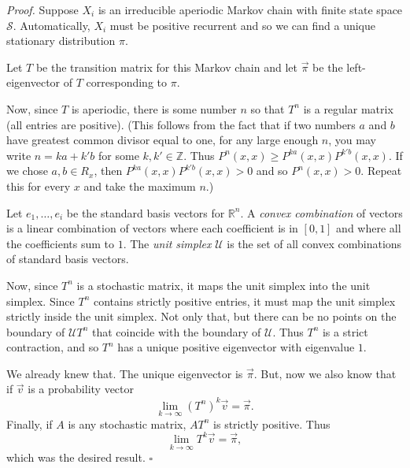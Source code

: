 \documentclass{problemset}
\newcommand{\R}{\mathbb{R}}
\newcommand{\Z}{\mathbb{Z}}
\newcommand{\1}{\mathbf{1}}
\newenvironment{proof}{\emph{Proof.}}{\hfill$\square$}
\begin{document}
	\begin{proof}
		Suppose $X_i$ is an irreducible aperiodic Markov chain with finite state space $\mathcal S$.  Automatically,
		$X_i$ must be positive recurrent and so we can find a unique stationary distribution $\pi$.
		
		Let $T$ be the transition matrix for this Markov chain and let $\vec \pi$ be the left-eigenvector
		of $T$ corresponding to $\pi$.

		Now, since $T$ is aperiodic, there is some number $n$ so that $T^n$ is a regular matrix (all
		entries are positive).  (This follows from the fact that if two numbers $a$ and $b$
		have greatest common divisor equal to one, for any large enough $n$, you may write $n=ka+k'b$
		for some $k,k'\in \Z$.  Thus $P^n(x,x)\geq P^{ka}(x,x)P^{k'b}(x,x)$.  If we chose $a,b\in R_x$,
		then $P^{ka}(x,x)P^{k'b}(x,x) >0$ and so $P^n(x,x)>0$.  Repeat this for every $x$ and take the
		maximum $n$.)

		Let $e_1,\ldots, e_i$ be the standard basis vectors for $\R^n$. A \emph{convex
		combination} of vectors is a linear combination of vectors where each coefficient is
		in $[0,1]$ and where all the coefficients sum to $1$.  The \emph{unit simplex} $\mathcal U$
		is the set of all convex combinations of standard basis vectors.

		Now, since $T^n$ is a stochastic matrix, it maps the unit simplex into the unit simplex.  Since
		$T^n$ contains strictly positive entries, it must map the unit simplex strictly inside the unit
		simplex.  Not only that, but there can be no points on the boundary of $\mathcal UT^n$ that coincide
		with the boundary of $\mathcal U$.  Thus $T^n$ is a strict contraction, and so $T^n$ has a unique
		positive eigenvector with eigenvalue $1$.

		We already knew that.  The unique eigenvector is $\vec \pi$.
		But, now we also know that if $\vec v$ is a probability vector
		\[
			\lim_{k\to\infty} (T^n)^k\vec v = \vec \pi.
		\]
		Finally, if $A$ is any stochastic matrix, $AT^n$ is strictly positive.  Thus
		\[
			\lim_{k\to\infty} T^k\vec v = \vec \pi,
		\]
		which was the desired result.
	\end{proof}
\end{document}
